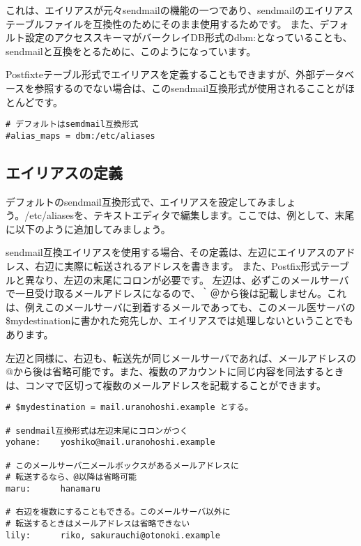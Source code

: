 これは、エイリアスが元々sendmailの機能の一つであり、sendmailのエイリアステーブルファイルを互換性のためにそのまま使用するためです。
また、デフォルト設定のアクセススキーマがバークレイDB形式のdbm:となっていることも、sendmailと互換をとるために、このようになっています。

Postfixteテーブル形式でエイリアスを定義することもできますが、外部データベースを参照するのでない場合は、このsendmail互換形式が使用されるこことがほとんどです。

\begin{lstlisting}[basicstyle=\ttfamily\footnotesize, frame=single]
# デフォルトはsemdmail互換形式
#alias_maps = dbm:/etc/aliases
\end{lstlisting}

\subsection{エイリアスの定義}
デフォルトのsendmail互換形式で、エイリアスを設定してみましょう。/etc/aliasesを、テキストエディタで編集します。ここでは、例として、末尾に以下のように追加してみましょう。

sendmail互換エイリアスを使用する場合、その定義は、左辺にエイリアスのアドレス、右辺に実際に転送されるアドレスを書きます。
また、Postfix形式テーブルと異なり、左辺の末尾にコロンが必要です。
左辺は、必ずこのメールサーバで一旦受け取るメールアドレスになるので、｀＠から後は記載しません。これは、例えこのメールサーバに到着するメールであっても、このメール医サーバの\$mydestinationに書かれた宛先しか、エイリアスでは処理しないということでもあります。

左辺と同様に、右辺も、転送先が同じメールサーバであれば、メールアドレスの@から後は省略可能です。また、複数のアカウントに同じ内容を同法するときは、コンマで区切って複数のメールアドレスを記載することができます。

\begin{lstlisting}[basicstyle=\ttfamily\footnotesize, frame=single]
# $mydestination = mail.uranohoshi.example とする。

# sendmail互換形式は左辺末尾にコロンがつく
yohane:    yoshiko@mail.uranohoshi.example

# このメールサーバ二メールボックスがあるメールアドレスに
# 転送するなら、@以降は省略可能
maru:      hanamaru

# 右辺を複数にすることもできる。このメールサーバ以外に
# 転送するときはメールアドレスは省略できない
lily:      riko, sakurauchi@otonoki.example
\end{lstlisting}

